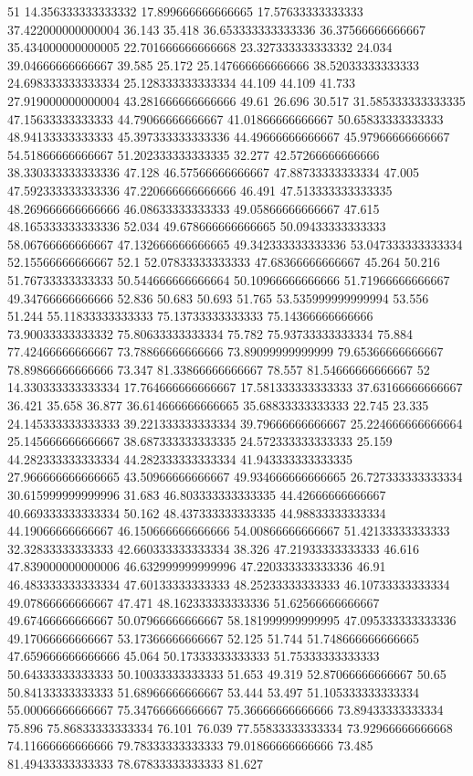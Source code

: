 51 14.356333333333332 17.899666666666665 17.57633333333333 37.422000000000004 36.143 35.418 36.653333333333336 36.37566666666667 35.434000000000005 22.701666666666668 23.327333333333332 24.034 39.04666666666667 39.585 25.172 25.147666666666666 38.52033333333333 24.698333333333334 25.128333333333334 44.109 44.109 41.733 27.919000000000004 43.281666666666666 49.61 26.696 30.517 31.585333333333335 47.15633333333333 44.79066666666667 41.01866666666667 50.65833333333333 48.94133333333333 45.397333333333336 44.49666666666667 45.97966666666667 54.51866666666667 51.202333333333335 32.277 42.57266666666666 38.330333333333336 47.128 46.57566666666667 47.88733333333334 47.005 47.592333333333336 47.220666666666666 46.491 47.513333333333335 48.269666666666666 46.08633333333333 49.05866666666667 47.615 48.165333333333336 52.034 49.678666666666665 50.09433333333333 58.06766666666667 47.132666666666665 49.342333333333336 53.047333333333334 52.15566666666667 52.1 52.07833333333333 47.68366666666667 45.264 50.216 51.76733333333333 50.544666666666664 50.10966666666666 51.71966666666667 49.34766666666666 52.836 50.683 50.693 51.765 53.535999999999994 53.556 51.244 55.11833333333333 75.13733333333333 75.14366666666666 73.90033333333332 75.80633333333334 75.782 75.93733333333334 75.884 77.42466666666667 73.78866666666666 73.89099999999999 79.65366666666667 78.89866666666666 73.347 81.33866666666667 78.557 81.54666666666667
52 14.330333333333334 17.764666666666667 17.581333333333333 37.63166666666667 36.421 35.658 36.877 36.614666666666665 35.68833333333333 22.745 23.335 24.145333333333333 39.221333333333334 39.79666666666667 25.224666666666664 25.145666666666667 38.687333333333335 24.572333333333333 25.159 44.282333333333334 44.282333333333334 41.943333333333335 27.966666666666665 43.50966666666667 49.934666666666665 26.727333333333334 30.615999999999996 31.683 46.803333333333335 44.42666666666667 40.669333333333334 50.162 48.437333333333335 44.98833333333334 44.19066666666667 46.150666666666666 54.00866666666667 51.42133333333333 32.32833333333333 42.660333333333334 38.326 47.21933333333333 46.616 47.839000000000006 46.632999999999996 47.220333333333336 46.91 46.483333333333334 47.60133333333333 48.25233333333333 46.10733333333334 49.07866666666667 47.471 48.162333333333336 51.62566666666667 49.67466666666667 50.07966666666667 58.181999999999995 47.095333333333336 49.17066666666667 53.17366666666667 52.125 51.744 51.748666666666665 47.659666666666666 45.064 50.17333333333333 51.75333333333333 50.64333333333333 50.10033333333333 51.653 49.319 52.87066666666667 50.65 50.84133333333333 51.68966666666667 53.444 53.497 51.105333333333334 55.00066666666667 75.34766666666667 75.36666666666666 73.89433333333334 75.896 75.86833333333334 76.101 76.039 77.55833333333334 73.92966666666668 74.11666666666666 79.78333333333333 79.01866666666666 73.485 81.49433333333333 78.67833333333333 81.627
